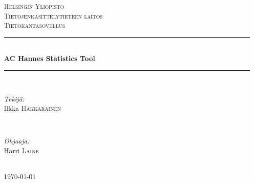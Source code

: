 \documentclass[12pt]{article} %
\begin{document}

\begin{titlepage}

\newcommand{\HRule}{\rule{\linewidth}{0.5mm}} %

\center %

\textsc{\LARGE Helsingin Yliopisto}\\[1.5cm] %
\textsc{\Large Tietojenkäsittelytieteen laitos}\\[0.5cm] %
\textsc{\large Tietokantasovellus}\\[0.5cm] %

\HRule \\[0.4cm]
{ \huge \bfseries AC Hannes Statistics Tool}\\[0.4cm] %
\HRule \\[1.5cm]

\begin{minipage}{0.4\textwidth}
\begin{flushleft} \large
\emph{Tekijä:}\\
Ilkka \textsc{Hakkarainen} %
\end{flushleft}
\end{minipage}
~
\begin{minipage}{0.4\textwidth}
\begin{flushright} \large
\emph{Ohjaaja:} \\
Harri \textsc{Laine} %
\end{flushright}
\end{minipage}\\[4cm]

{\large \today}\\[3cm] %


\vfill %

\end{titlepage}

\end{document}
